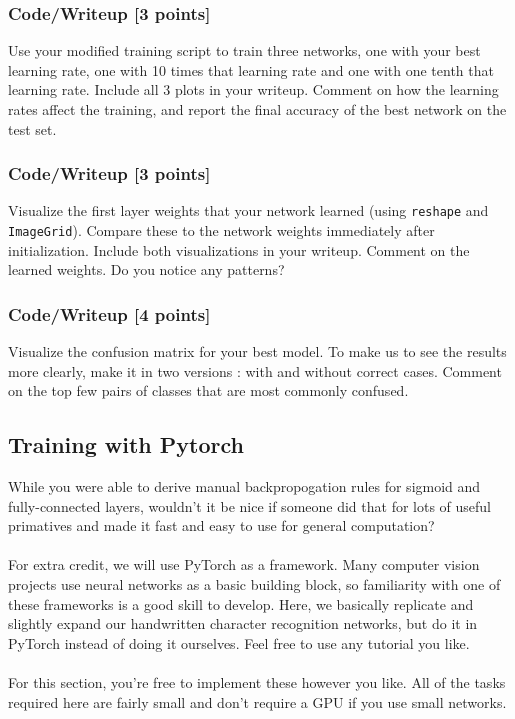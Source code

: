 \documentclass[a4 paper]{article}
\numberwithin{equation}{section}
\newcommand{\0}{\mathbf{0}}
\begin{document}
        \subsubsection{Code/Writeup [3 points]}
        Use your modified training script to train three networks, one with your best learning rate, one with 10 times that learning rate and one with one tenth that learning rate. Include all 3 plots in your writeup. Comment on how the learning rates affect the training, and report the final accuracy of the best network on the test set. 
        
        \subsubsection{Code/Writeup [3 points]}
        Visualize the first layer weights that your network learned (using \texttt{reshape} and \texttt{ImageGrid}). Compare these to the network weights immediately after initialization. Include both visualizations in your writeup. Comment on the learned weights. Do you notice any patterns?
        
        \subsubsection{Code/Writeup [4 points]}
        Visualize the confusion matrix for your best model. To make us to see the results more clearly, make it in two versions : with and without correct cases. Comment on the top few pairs of classes that are most commonly confused.

    \subsection{Training with Pytorch}
        While you were able to derive manual backpropogation rules for sigmoid and fully-connected layers, wouldn’t it be nice if someone did that for lots of useful primatives and made it fast and easy to use for general computation?\\
        \\
        For extra credit, we will use PyTorch as a framework. Many computer vision projects use neural networks as a basic building block, so familiarity with one of these frameworks is a good skill to develop. Here, we basically replicate and slightly expand our handwritten character recognition networks, but do it in PyTorch instead of doing it ourselves. Feel free to use any tutorial you like.\\
        \\
        For this section, you’re free to implement these however you like. All of the tasks required here are fairly small and don’t require a GPU if you use small networks.
    
\end{document}
